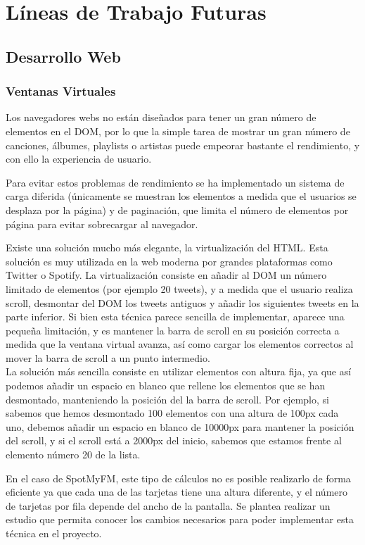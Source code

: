 \section{Líneas de Trabajo Futuras}

\subsection{Desarrollo Web}

\subsubsection{Ventanas Virtuales}
Los navegadores webs no están diseñados para tener un gran número de elementos en el DOM, por lo que la simple tarea de mostrar un gran número de canciones, álbumes, playlists o artistas  puede empeorar bastante el rendimiento, y con ello la experiencia de usuario. 

Para evitar estos problemas de rendimiento se ha implementado un sistema de carga diferida (únicamente se muestran los elementos a medida que el usuarios se desplaza por la página) y de paginación, que limita el número de elementos por página para evitar sobrecargar al navegador. 

Existe una solución mucho más elegante, la virtualización del HTML. Esta solución es muy utilizada en la web moderna por grandes plataformas como Twitter o Spotify. La virtualización consiste en añadir al DOM un número limitado de elementos (por ejemplo 20 tweets), y a medida que el usuario realiza scroll, desmontar del DOM los tweets antiguos y añadir los siguientes tweets en la parte inferior.
Si bien esta técnica parece sencilla de implementar, aparece una pequeña limitación, y es mantener la barra de scroll en su posición correcta a medida que la ventana virtual avanza, así como cargar los elementos correctos al mover la barra de scroll a un punto intermedio.\\
La solución más sencilla consiste en utilizar elementos con altura fija, ya que así podemos añadir un espacio en blanco que rellene los elementos que se han desmontado, manteniendo la posición del la barra de scroll. Por ejemplo, si sabemos que hemos desmontado 100 elementos con una altura de 100px cada uno, debemos añadir un espacio en blanco de 10000px para mantener la posición del scroll, y si el scroll está a 2000px del inicio, sabemos que estamos frente al elemento número 20 de la lista.

En el caso de SpotMyFM, este tipo de cálculos no es posible realizarlo de forma eficiente ya que cada una de las tarjetas tiene una altura diferente, y el número de tarjetas por fila depende del ancho de la pantalla.
Se plantea realizar un estudio que permita conocer los cambios necesarios para poder implementar esta técnica en el proyecto. 

